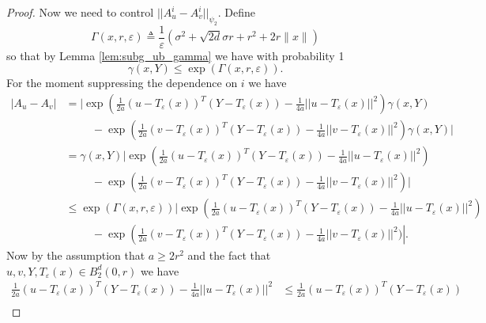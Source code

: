 \documentclass{article}
\theoremstyle{definition}
\newcommand{\Teps}{T_\varepsilon}
\begin{document}
\begin{proof}
    Now we need to control $||A^i_u - A^i_v||_{\psi_2}$. Define
    \begin{equation*}
        \Gamma(x,r, \varepsilon) \triangleq  \frac{1}{\varepsilon} \left (\sigma^2 + \sqrt{2 d} \sigma r + r^2 + 2r\|x\| \right )
    \end{equation*}
    so that by Lemma \ref{lem:subg_ub_gamma} we have with probability 1
    \begin{equation*}
        \gamma(x,Y) \leq \exp\left (\Gamma(x,r, \varepsilon) \right ).
    \end{equation*}
    For the moment suppressing the dependence on $i$ we have 
    \begin{align*}
        |A_u - A_v| &= \bigg | 
            \exp \left (
                \frac{1}{2a}\left ( u - \Teps(x) \right )^T(Y - \Teps(x)) - \frac{1}{4a}||u - \Teps(x)||^2 
            \right ) \gamma(x,Y) \nonumber \\
            &\hspace{1cm} - \exp \left (
                \frac{1}{2a}\left ( v - \Teps(x) \right )^T(Y - \Teps(x)) - \frac{1}{4a}||v - \Teps(x)||^2 
            \right ) \gamma(x,Y)
        \bigg | \nonumber \\
        &= \gamma(x,Y) \bigg | 
            \exp \left (
                \frac{1}{2a}\left ( u - \Teps(x) \right )^T(Y - \Teps(x)) - \frac{1}{4a}||u - \Teps(x)||^2 
            \right ) \nonumber \\
        &\hspace{1cm} - \exp \left (
                \frac{1}{2a}\left ( v - \Teps(x) \right )^T(Y - \Teps(x)) - \frac{1}{4a}||v - \Teps(x)||^2 
            \right )
        \bigg | \nonumber\\
        &\leq \exp\left(\Gamma(x,r, \varepsilon) \right)  \bigg | 
            \exp \left (
                \frac{1}{2a}\left ( u - \Teps(x) \right )^T(Y - \Teps(x)) - \frac{1}{4a}||u - \Teps(x)||^2 
            \right ) \nonumber \\
        &\hspace{1cm} - \exp \left (
                \frac{1}{2a}\left ( v - \Teps(x) \right )^T(Y - \Teps(x)) - \frac{1}{4a}||v - \Teps(x)||^2 
            \bigg )
        \right |.
    \end{align*}
    Now by the assumption that $a \geq 2r^2$ and the fact that $u,v,Y,\Teps(x) \in B_2^d(0,r)$ we have 
    \begin{align*}
        \frac{1}{2a}\left ( u - \Teps(x) \right )^T(Y - \Teps(x)) - \frac{1}{4a}||u - \Teps(x)||^2 &\leq \frac{1}{2a}\left ( u - \Teps(x) \right )^T(Y - \Teps(x)) \\

\end{align*}
\end{proof}
\end{document}

